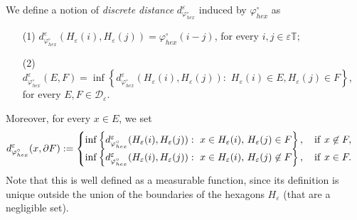 \documentclass{interact}
\numberwithin{equation}{section}
\theoremstyle{definition}
\newcommand{\R}{\mathbb{R}}
\newcommand{\I}{\mathcal{I}}
\renewcommand{\epsilon}{\varepsilon}
\def\e{\epsilon}
\begin{document}
We define a notion of \emph{discrete distance} $d_{\varphi^\circ_{hex}}^\epsilon$ induced by $\varphi^\circ_{hex}$ as
\begin{enumerate}
\item[(1)] $d_{\varphi^\circ_{hex}}^\epsilon(H_\epsilon(i),H_\epsilon(j))=\varphi^\circ_{hex}(i-j)$,\,\,for every $i,j\in\varepsilon\mathbb{T}$;
\item[(2)] $d_{\varphi^\circ_{hex}}^\epsilon(E,F)=\inf\left\{d_{\varphi^\circ_{hex}}^\epsilon(H_\epsilon(i),H_\epsilon(j)):\,\,H_\epsilon(i)\in E,H_\epsilon(j)\in F \right\}$, for every $E,F\in\mathcal{D}_\epsilon$.
\end{enumerate}
Moreover, for every $x\in E$, we set
\begin{equation}
d_{\varphi^\circ_{hex}}^\epsilon(x,\partial F):=
\begin{cases}
\inf\left\{d_{\varphi^\circ_{hex}}^\epsilon(H_\epsilon(i),H_\epsilon(j)):\,\,x\in H_\epsilon(i), \, H_\epsilon(j)\in F \right\},\quad {\rm if}\,\, x\not\in F,\\
\inf\left\{d_{\varphi^\circ_{hex}}^\epsilon(H_\epsilon(i),H_\epsilon(j)):\,\,x\in H_\epsilon(i), \, H_\epsilon(j)\not\in F \right\},\quad {\rm if}\,\, x\in F.
\end{cases}
\label{discretedistance}
\end{equation}
Note that this is well defined as a measurable function, since its definition is unique outside the union of the boundaries of the hexagons $H_\epsilon$ (that are a negligible set).\\

\end{document}
